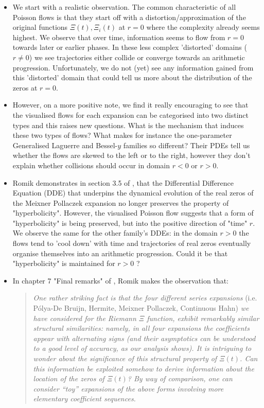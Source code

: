 \documentclass[a4paper,11pt,twoside]{amsart}
\begin{document}
\begin{itemize}
  \item We start with a realistic observation. The common characteristic of all Poisson flows is that they start off with a distortion/approximation of the original functions $\Xi(t), \Xi_i(t)$ at $r=0$ where the complexity already seems highest. We observe that over time, information seems to flow from $r=0$ towards later or earlier phases. In these less complex 'distorted' domains ($r \ne 0$) we see trajectories either collide or converge towards an arithmetic progression. Unfortunately, we do not (yet) see any information gained from this 'distorted' domain that could tell us more about the distribution of the zeros at $r=0$. 
\item However, on a more positive note, we find it really encouraging to see that the visualised flows for each expansion can be categorised into two distinct types and this raises new questions. What is the mechanism that induces these two types of flows? What makes for instance the one-parameter Generalised Laguerre and Bessel-$y$ families so different? Their PDEs tell us whether the flows are skewed to the left or to the right, however they don't explain whether collisions should occur in domain $r < 0$ or $r > 0$. 
\item Romik demonstrates in section 3.5 of \cite{rom}, that the Differential Difference Equation (DDE) that underpins the dynamical evolution of the real zeros of the Meixner Pollaczek expansion no longer preserves the property of "hyperbolicity". However, the visualised Poisson flow suggests that a form of "hyperbolicity" is being preserved, but into the positive direction of "time" $r$. We observe the same for the other family's DDEs: in the domain $r > 0$ the flows tend to 'cool down' with time and trajectories of real zeros eventually organise themselves into an arithmetic progression. Could it be that "hyperbolicity" is maintained for $r > 0$ ? 
\item In chapter 7 "Final remarks" of \cite{rom}, Romik makes the observation that:
\begin{quotation}
\textit{One rather striking fact is that the four different series expansions} (i.e. Pólya-De Bruijn, Hermite, Meixner Pollaczek, Continuous Hahn) \textit{we have considered for the Riemann $\Xi$ function, exhibit remarkably similar structural similarities: namely, in all four expansions the coefficients appear with alternating signs (and their asymptotics can be understood to a good level of accuracy, as our analysis shows). It is intriguing to wonder about the significance of this structural property of $\Xi(t)$. Can this information be exploited somehow to derive information about the location of the zeros of $\Xi(t)$? By way of comparison, one can consider “toy” expansions of the above forms involving more elementary coefficient sequences.}
\end{quotation}


\end{itemize}
\end{document}
